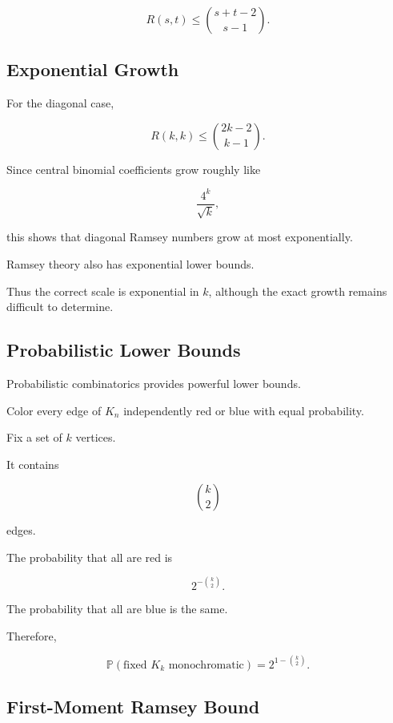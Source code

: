 \[
\boxed{
R(s,t)
\leq
\binom{s+t-2}{s-1}.
}
\]

\subsection{Exponential Growth}
\label{subsec:ramsey-exponential-growth}

For the diagonal case,

\[
R(k,k)
\leq
\binom{2k-2}{k-1}.
\]

Since central binomial coefficients grow roughly like

\[
\frac{4^k}{\sqrt{k}},
\]

this shows that diagonal Ramsey numbers grow at most exponentially.

Ramsey theory also has exponential lower bounds.

Thus the correct scale is exponential in \(k\), although the exact
growth remains difficult to determine.

\subsection{Probabilistic Lower Bounds}
\label{subsec:probabilistic-ramsey-lower}

Probabilistic combinatorics provides powerful lower bounds.

Color every edge of \(K_n\) independently red or blue with equal
probability.

Fix a set of \(k\) vertices.

It contains

\[
\binom{k}{2}
\]

edges.

The probability that all are red is

\[
2^{-\binom{k}{2}}.
\]

The probability that all are blue is the same.

Therefore,

\[
\boxed{
\mathbb{P}
(\text{fixed }K_k\text{ monochromatic})
=
2^{1-\binom{k}{2}}.
}
\]

\subsection{First-Moment Ramsey Bound}
\label{subsec:first-moment-ramsey}

